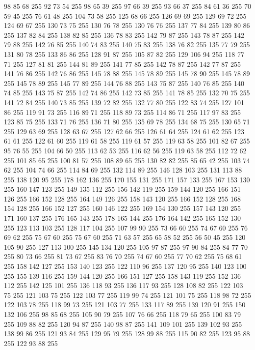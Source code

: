 98 85 68 255 92 73 54 255 98 65 39 255 97 66 39 255 93 66 37 255 84 61 36 255 70 59 45 255 76 61 48 255 104 73 58 255 125 68 66 255 126 69 69 255 129 69 72 255 124 69 67 255 130 73 75 255 130 76 78 255 130 76 76 255 137 77 84 255 139 80 86 255 137 82 84 255 138 82 85 255 136 78 83 255 142 79 87 255 143 78 87 255 142 79 88 255 142 76 85 255 140 74 83 255 140 75 83 255 138 76 82 255 135 77 79 255 131 80 78 255 133 86 86 255 128 91 87 255 105 87 82 255 129 106 94 255 118 77 71 255 127 81 81 255 144 81 89 255 141 77 85 255 142 78 87 255 142 77 87 255 141 76 86 255 142 76 86 255 145 78 88 255 145 78 89 255 145 78 90 255 145 78 89 255 145 78 89 255 145 77 89 255 144 76 88 255 143 75 87 255 140 76 85 255 140 74 85 255 143 75 87 255 142 74 86 255 142 73 85 255 141 78 85 255 132 70 75 255 141 72 84 255 140 73 85 255 139 72 82 255 132 77 80 255 122 83 74 255 127 101 86 255 119 91 73 255
116 89 71 255 118 89 73 255 114 86 71 255 117 97 83 255 123 85 75 255 133 71 76 255 136 71 80 255 135 69 78 255 134 68 75 255 130 65 71 255 129 63 69 255 128 63 67 255 127 62 66 255 126 61 64 255 124 61 62 255 123 61 61 255 122 61 60 255 119 61 58 255 119 61 57 255 119 63 58 255 101 82 67 255 95 76 55 255 104 66 50 255 113 62 53 255 116 62 56 255 119 63 58 255 112 72 62 255 101 85 65 255 100 81 57 255 108 89 65 255 130 82 82 255 85 65 42 255 103 74 62 255 104 74 66 255 114 84 69 255 132 114 89 255 146 128 103 255 131 113 88 255 138 120 95 255 178 162 136 255 170 155 131 255 171 157 133 255 167 153 130 255 160 147 123 255 149 135 112 255 156 142 119 255 159 144 120 255 166 151 126 255 166 152 128 255 164 149 126 255 158 143 120 255 166 152 128 255 168 154 128 255 166 152 127 255 160 146 122 255 169 154 130 255 157 143 120 255 171 160 137 255 176 165 143 255 178 165 144 255 176 164 142 255 165 152 130 255 123 113 103 255 128 117 104 255
107 99 90 255 73 66 60 255 74 67 60 255 76 69 62 255 75 67 60 255 75 67 60 255 71 63 57 255 65 58 52 255 56 50 45 255 120 105 90 255 127 113 100 255 145 134 120 255 105 97 87 255 97 90 84 255 84 77 70 255 80 73 66 255 81 73 67 255 83 76 70 255 74 67 60 255 77 70 62 255 75 68 61 255 158 142 127 255 153 140 123 255 122 110 96 255 137 120 95 255 140 123 100 255 155 139 116 255 159 144 120 255 166 151 127 255 158 143 119 255 152 136 112 255 142 125 101 255 136 118 93 255 136 117 93 255 128 108 82 255 122 103 75 255 121 103 75 255 122 103 77 255 119 99 74 255 121 101 75 255 118 98 72 255 122 103 78 255 118 99 73 255 121 103 77 255 133 117 89 255 139 120 91 255 150 132 106 255 98 85 68 255 105 90 79 255 107 76 66 255 118 79 65 255 100 83 79 255 109 88 82 255 120 94 87 255 140 98 87 255 141 109 101 255 139 102 93 255 138 99 86 255 121 93 84 255 129 95 79 255 128 99 88 255 115 90 82 255 123 95 88 255 122 93 88 255
